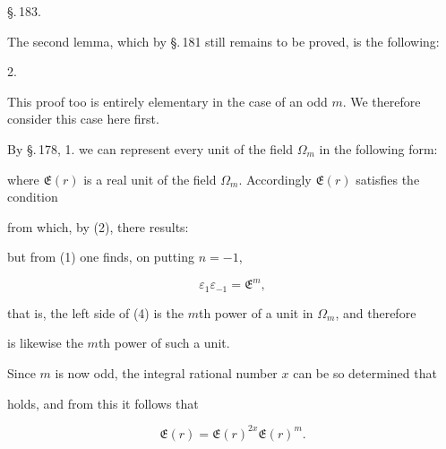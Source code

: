 

\begin{center}
\S.\,183.

\end{center}

The second lemma, which by \S.\,181 still remains to be proved, is the
following:

2. 



This proof too is entirely elementary in the case of an odd $m$. We
therefore consider this case here first.

By \S.\,178, 1. we can represent every unit of the field $\Omega_m$ in
the following form:


where $\mathfrak{E}(r)$ is a real unit of the field $\Omega_m$.
Accordingly $\mathfrak{E}(r)$ satisfies the condition


from which, by (2), there results:


but from (1) one finds, on putting $n = -1$,

\[
\varepsilon_1 \varepsilon_{-1} = \mathfrak{E}^m,
\]

that is, the left side of (4) is the $m$th power of a unit in
$\Omega_m$, and therefore


is likewise the $m$th power of such a unit.

Since $m$ is now odd, the integral rational number $x$ can be so
determined that


holds, and from this it follows that

\[
\mathfrak{E}(r) = \mathfrak{E}(r)^{2x} \mathfrak{E}(r)^m.
\]

